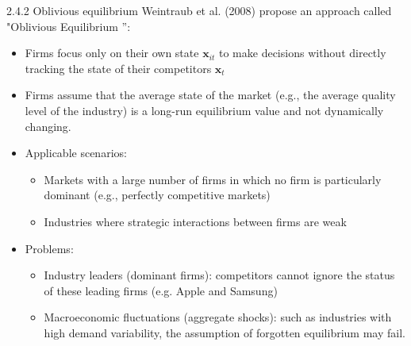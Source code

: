 \documentclass[aspectratio=169]{beamer}  %
\begin{document}
\begin{frame}
{2.4.2 Oblivious equilibrium}
Weintraub et al. (2008) propose an approach called "Oblivious Equilibrium ”:
\begin{itemize}
    \item Firms focus only on their own state $\mathbf{x}_{it}$ to make decisions without directly tracking the state of their competitors $\mathbf{x}_t$
    \item Firms assume that the average state of the market (e.g., the average quality level of the industry) is a long-run equilibrium value and not dynamically changing.
    \item Applicable scenarios:
    \begin{itemize}
        \item Markets with a large number of firms in which no firm is particularly dominant (e.g., perfectly competitive markets)
        \item Industries where strategic interactions between firms are weak
    \end{itemize}
    
    \item Problems:
    \begin{itemize}
        \item Industry leaders (dominant firms): competitors cannot ignore the status of these leading firms (e.g. Apple and Samsung)
    \item Macroeconomic fluctuations (aggregate shocks): such as industries with high demand variability, the assumption of forgotten equilibrium may fail.
    \end{itemize}
\end{itemize}
\end{frame}
\end{document}
